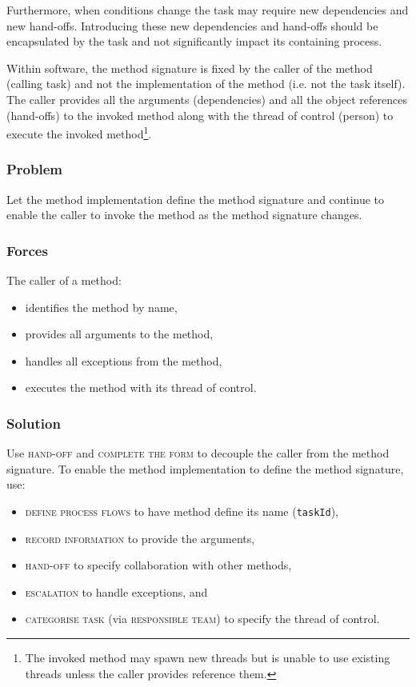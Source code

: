 \documentclass[prodmode]{style/acmlarge}
\begin{document}
Furthermore, when conditions change the task may require new dependencies and
new hand-offs.  Introducing these new dependencies and hand-offs should be
encapsulated by the task and not significantly impact its containing process.

Within software, the method signature is fixed by the caller of the method
(calling task) and not the implementation of the method (i.e. not the task
itself).  The caller provides all the arguments (dependencies) and all the
object references (hand-offs) to the invoked method along with the thread of
control (person) to execute the invoked method\footnote{The invoked method may
spawn new threads but is unable to use existing threads unless the caller
provides reference them.}.

\subsubsection*{\textbf{Problem}} Let the method implementation define the method
signature and continue to enable the caller to invoke the method as the method
signature changes.

\subsubsection*{Forces} The caller of a method:
\begin{itemize}
  \item identifies the method by name,
  \item provides all arguments to the method,
  \item handles all exceptions from the method,
  \item executes the method with its thread of control.
\end{itemize}

\subsubsection*{\textbf{Solution}} Use \textsc{hand-off} and \textsc{complete the form}
to decouple the caller from the method signature.  To enable the method
implementation to define the method signature, use:
\begin{itemize}
  \item \textsc{define process flows} to have method define its name (\texttt{taskId}),
  \item \textsc{record information} to provide the arguments,
  \item \textsc{hand-off} to specify collaboration with other methods,
  \item \textsc{escalation} to handle exceptions, and
  \item \textsc{categorise task} (via \textsc{responsible team}) to specify the thread of control.    
\end{itemize}
\end{document}
